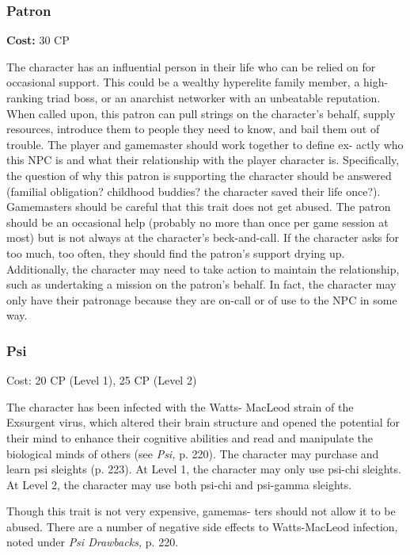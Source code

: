 \subsubsection{Patron}

\textbf{Cost:} 30 CP

The character has an influential person in their 
life who can be relied on for occasional support. 
This could be a wealthy hyperelite family member, a 
high-ranking triad boss, or an anarchist networker 
with an unbeatable reputation. When called upon, 
this patron can pull strings on the character's behalf, 
supply resources, introduce them to people they need 
to know, and bail them out of trouble. The player 
and gamemaster should work together to define ex-
actly who this NPC is and what their relationship 
with the player character is. Specifically, the question 
of why this patron is supporting the character should 
be answered (familial obligation? childhood buddies? 
the character saved their life once?). Gamemasters 
should be careful that this trait does not get abused. 
The patron should be an occasional help (probably 
no more than once per game session at most) but is 
not always at the character's beck-and-call. If the 
character asks for too much, too often, they should 
find the patron's support drying up. Additionally, the 
character may need to take action to maintain the 
relationship, such as undertaking a mission on the 
patron's behalf. In fact, the character may only have 
their patronage because they are on-call or of use to 
the NPC in some way.

\subsubsection{Psi}

Cost: 20 CP (Level 1), 25 CP (Level 2) 

The character has been infected with the Watts-
MacLeod strain of the Exsurgent virus, which altered 
their brain structure and opened the potential for their 
mind to enhance their cognitive abilities and read and 
manipulate the biological minds of others (see \textit{Psi,} 
p. 220). The character may purchase and learn psi 
sleights (p. 223). At Level 1, the character may only 
use psi-chi sleights. At Level 2, the character may use 
both psi-chi and psi-gamma sleights. 

Though this trait is not very expensive, gamemas-
ters should not allow it to be abused. There are a 
number of negative side effects to Watts-MacLeod 
infection, noted under \textit{Psi Drawbacks, }p. 220.

